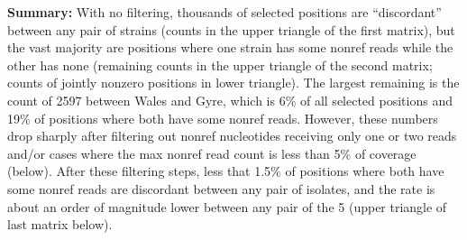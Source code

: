 \documentclass{article}\usepackage[]{graphicx}\usepackage[]{color}
\begin{document}
{\bf Summary:} With no filtering, thousands of selected positions are ``discordant'' between any pair of strains (counts in the upper triangle of the first matrix), but the vast majority are positions where one strain has some nonref reads while the other has none (remaining counts in the upper triangle of the second matrix; counts of jointly nonzero positions in lower triangle).  The largest remaining is the count of 2597 between Wales and Gyre, which is 6\% of all selected positions and 19\% of positions where both have some nonref reads.  However, these numbers drop sharply after filtering out nonref nucleotides receiving only one or two reads and/or cases where the max nonref read count is less than 5\% of coverage (below).  After these filtering steps, less that 1.5\% of positions where both have some nonref reads are discordant between any pair of isolates, and the rate is about an order of magnitude lower between any pair of the 5 (upper triangle of last matrix below).
\end{document}
